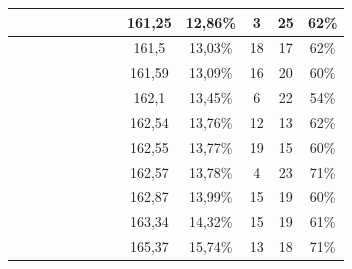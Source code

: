 \begin{center}
\begin{longtable}{|c|c|c|c|c|c|c|c|c|c|c|c|c|}
 \x &  &  \x &  &  &  &  \x &  \x & 161,25 & 12,86\% & 3 & 25 & 62\% \\ \hline
 \x &  &  \x &  \x &  \x &  &  &  \x & 161,5 & 13,03\% & 18 & 17 & 62\% \\ \hline
 \x &  &  &  &  \x &  &  \x &  \x & 161,59 & 13,09\% & 16 & 20 & 60\% \\ \hline
 \x &  \x &  &  \x &  &  &  \x &  \x & 162,1 & 13,45\% & 6 & 22 & 54\% \\ \hline
 \x &  &  \x &  &  \x &  &  \x &  \x & 162,54 & 13,76\% & 12 & 13 & 62\% \\ \hline
 \x &  \x &  &  \x &  \x &  &  &  \x & 162,55 & 13,77\% & 19 & 15 & 60\% \\ \hline
 \x &  &  &  \x &  &  \x &  \x &  \x & 162,57 & 13,78\% & 4 & 23 & 71\% \\ \hline
 \x &  &  &  \x &  \x &  &  &  \x & 162,87 & 13,99\% & 15 & 19 & 60\% \\ \hline
 \x &  &  &  \x &  \x &  &  \x &  \x & 163,34 & 14,32\% & 15 & 19 & 61\% \\ \hline
 \x &  &  \x &  \x &  \x &  \x &  &  \x & 165,37 & 15,74\% & 13 & 18 & 71\% \\ \hline
\end{longtable}
\label{table:windProdInputParamsSeasonal}
\end{center}
\normalsize

